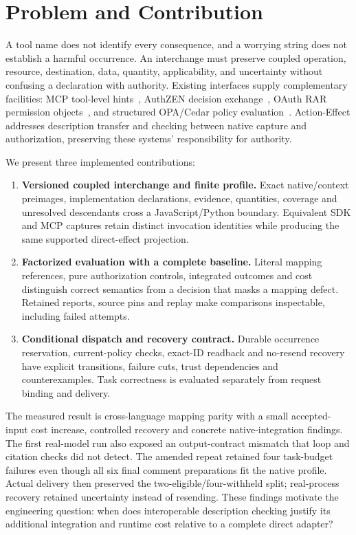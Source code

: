 \documentclass[11pt,letterpaper]{article}
\begin{document}
\section{Problem and Contribution}

A tool name does not identify every consequence, and a worrying string does
not establish a harmful occurrence. An interchange must preserve coupled
operation, resource, destination, data, quantity, applicability, and uncertainty
without confusing a declaration with authority. Existing interfaces supply
complementary facilities: MCP tool-level hints~\cite{mcp}, AuthZEN decision
exchange~\cite{authzen}, OAuth RAR permission objects~\cite{rar}, and structured
OPA/Cedar policy evaluation~\cite{opa-api,opa-lang,cedar-auth,cedar-validation}.
Action-Effect addresses description transfer and checking between native capture
and authorization, preserving these systems' responsibility for authority.

We present three implemented contributions:
\begin{enumerate}
\item \textbf{Versioned coupled interchange and finite profile.} Exact
native/context preimages, implementation declarations, evidence, quantities,
coverage and unresolved descendants cross a JavaScript/Python boundary.
Equivalent SDK and MCP captures retain distinct invocation identities while
producing the same supported direct-effect projection.
\item \textbf{Factorized evaluation with a complete baseline.} Literal mapping
references, pure authorization controls, integrated outcomes and cost distinguish
correct semantics from a decision that masks a mapping defect. Retained reports,
source pins and replay make comparisons inspectable, including failed attempts.
\item \textbf{Conditional dispatch and recovery contract.} Durable occurrence
reservation, current-policy checks, exact-ID readback and no-resend recovery have
explicit transitions, failure cuts, trust dependencies and counterexamples.
Task correctness is evaluated separately from request binding and delivery.
\end{enumerate}

The measured result is cross-language mapping parity with a small accepted-input
cost increase, controlled recovery and concrete native-integration findings.
The first real-model run also exposed an output-contract mismatch that loop and
citation checks did not detect. The amended repeat retained four task-budget
failures even though all six final comment preparations fit the native profile.
Actual delivery then preserved the two-eligible/four-withheld split; real-process
recovery retained uncertainty instead of resending.
These findings motivate the engineering question:
when does interoperable description checking justify its additional integration
and runtime cost relative to a complete direct adapter?
\end{document}
